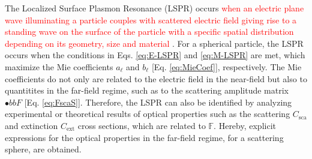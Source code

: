 
The Localized Surface Plasmon Resonance (LSPR) occurs \textcolor{red}{when an electric plane wave illuminating a particle couples with scattered electric field giving rise to a standing wave on the surface of the particle with a specific spatial distribution depending on its geometry, size and material \cite{novotny_principles_2011}}. For a spherical particle, the LSPR occurs when the conditions in Eqs. \eqref{eq:E-LSPR} and \eqref{eq:M-LSPR} are met, which maximize the Mie coefficients  $a_\ell$ and $b_\ell$ [Eq. \eqref{eq:MieCoef}], respectively. The Mie coefficients do not only are related to the electric field in the near-field but also to quantitites in the far-field regime, such as to the scattering amplitude matrix $\mathbb{•}bb{F}$ [Eq. \eqref{eq:FscaS}]. Therefore, the LSPR can also be identified by analyzing experimental or theoretical results of optical properties such as the scattering $C_\text{sca}$ and extinction $C_\text{ext}$ cross sections, which are related to $\mathbb{F}$.  Hereby, explicit expressions for the optical properties in the far-field regime, for a scattering sphere, are obtained.

